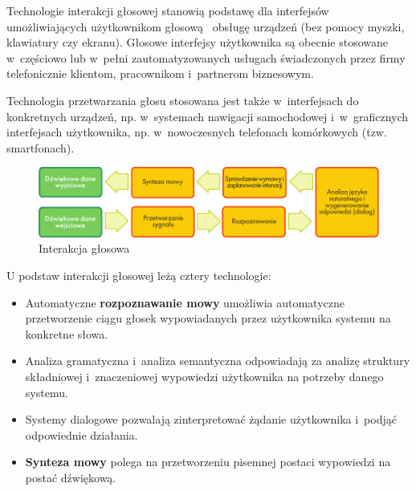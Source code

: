 \begin{multicols}{2}
Technologie interakcji głosowej stanowią podstawę dla interfejsów
umożliwiających użytkownikom głosową \ obsługę urządzeń (bez
pomocy myszki, klawiatury czy ekranu). Głosowe interfejsy
użytkownika są obecnie stosowane w~częściowo lub w~pełni
zautomatyzowanych usługach świadczonych przez firmy telefonicznie
klientom, pracownikom i~partnerom biznesowym. 


Technologia przetwarzania głosu stosowana jest także w~interfejsach
do konkretnych urządzeń, np. w~systemach nawigacji samochodowej
i~w~graficznych interfejsach użytkownika, np. w~nowoczesnych
telefonach komórkowych (tzw. smartfonach). 

\begin{figure}[htb]  \center
\includegraphics[width=\textwidth]{../_media/polish/simple_speech-based_dialogue_architecture}
\caption{Interakcja głosowa} \label{fig: dialoguearch_pl}
 \end{figure} 

U podstaw interakcji głosowej leżą cztery technologie: 

\begin{itemize} \item Automatyczne \textbf{rozpoznawanie mowy}
umożliwia automatyczne przetworzenie ciągu głosek wypowiadanych
przez użytkownika systemu na konkretne słowa. \item Analiza
gramatyczna i~analiza semantyczna odpowiadają za analizę struktury
składniowej i~znaczeniowej wypowiedzi użytkownika na potrzeby danego
systemu. \item Systemy dialogowe pozwalają zinterpretować żądanie
użytkownika i~podjąć odpowiednie działania. \item \textbf{Synteza
mowy} polega na przetworzeniu pisemnej postaci wypowiedzi na postać
dźwiękową. \end{itemize} 


\end{multicols}
